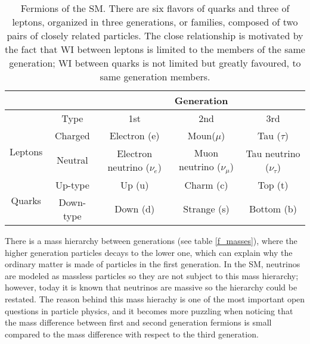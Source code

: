 
\begin{center}
\begin{table}[h!]
\centering
\footnotesize
\begin{tabular}{ccccc} \hline
                         &         & \multicolumn{3}{c}{Generation}                                                           \\ \hline
                         &Type     & 1st                          & 2nd                        & 3rd                          \\ \hline
\multirow{2}{*}{Leptons} &Charged  & Electron (e)                 & Moun($\mu$)                & Tau ($\tau$)                 \\%
                         &Neutral  & Electron neutrino ($\nu_e$)  & Muon neutrino ($\nu_{\mu}$) & Tau neutrino ($\nu_{\tau}$) \\\hline
\multirow{2}{*}{Quarks}  &Up-type  & Up (u)                       & Charm (c)                & Top (t)                        \\%
                         &Down-type& Down (d)                     & Strange (s)              & Bottom (b)                     \\\hline
\end{tabular}
\caption[Fermions of the SM.]{Fermions of the SM. There are six flavors of quarks and three of leptons, organized in three generations, or families, composed of two pairs of closely related particles. The close relationship is motivated by the fact that WI between leptons is limited to the members of the same generation; WI between quarks is not limited but greatly favoured, to same generation members. }\label{flav_gen}
\end{table}
\end{center}
\noindent There is a mass hierarchy between generations (see table \ref{f_masses}), where the higher generation particles decays to the lower one, which can explain why the ordinary matter is made of particles in the first generation. In the SM, neutrinos are modeled as massless particles so they are not subject to this mass hierarchy; however, today it is known that neutrinos are massive so the hierarchy could be restated. The reason behind this mass hierachy is one of the most important open questions in particle physics, and it becomes more puzzling when noticing that the mass difference between first and second generation fermions is small compared to the mass difference with respect to the third generation.
